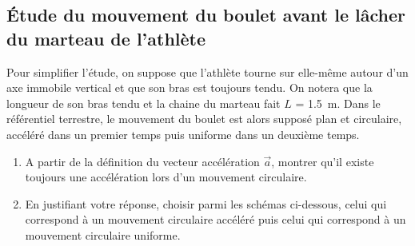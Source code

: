 \documentclass[a4paper,11pt,fleqn]{article}%
\begin{document}
	\subsection{Étude du mouvement du boulet avant le lâcher du marteau de l'athlète}
	Pour simplifier l'étude, on suppose que l'athlète tourne sur elle-même autour d'un axe immobile vertical et que son bras est toujours tendu. On notera que la longueur de son bras tendu et la chaine du marteau fait $L$ = \SI{1.5}{m}. Dans le référentiel terrestre, le mouvement du boulet est alors supposé plan et circulaire, accéléré dans un premier temps puis uniforme dans un deuxième temps.
	\begin{enumerate}
		\item A partir de la définition du vecteur accélération $\vec{a}$, montrer qu'il existe toujours une accélération lors d'un mouvement circulaire.
		\item En justifiant votre réponse, choisir parmi les schémas ci-dessous, celui qui correspond à un mouvement circulaire accéléré puis celui qui correspond à un mouvement circulaire uniforme.
	\end{enumerate}

\begin{figure}[h!]
\centering
	 \hspace{1cm}
	 \hspace{1cm}
	 \hspace{1cm}

\end{figure}
	
\end{document}
